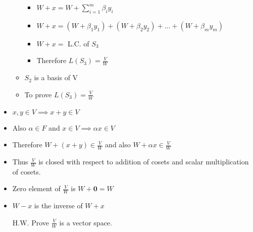 \documentclass[twoside]{article}
\begin{document}
\begin{itemize}
\begin{itemize}
\begin{itemize}
				\item $W + x = W + \sum_{i=1}^{m}\beta_i y_i$
				\item $W + x = (W + \beta_1 y_1) + (W + \beta_2 y_2) + ... + (W + \beta_m y_m)$
				\item $W + x =$ L.C. of $S_3$
				\item Therefore $L(S_3) = \frac{V}{W}$
			\end{itemize}
			\item $S_2$ is a basis of V
			\item To prove $L(S_3) = \frac{V}{W}$
		\end{itemize}
		\item $x, y \in V \implies x + y \in V$
		\item Also $\alpha \in F$ and $x \in V \implies \alpha x \in V$
		\item Therefore $W + (x + y) \in \frac{V}{W}$ and also $W + \alpha x \in \frac{V}{W}$
		\item Thus $\frac{V}{W}$ is closed with respect to addition of cosets and scalar multiplication of cosets.
		\item Zero element of $\frac{V}{W}$ is $W + \mathbf{0} = W$
		\item $W - x$ is the inverse of $W + x$
		\item [H.W.] Prove $\frac{V}{W}$ is a vector space.
	\end{itemize}
\end{document}
